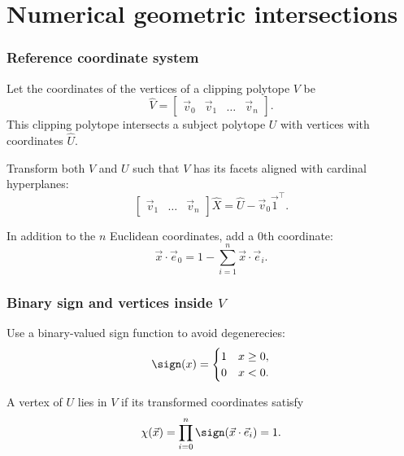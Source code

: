 \documentclass[10pt]{beamer}
\begin{document}
\section{Numerical geometric intersections}

\newcommand{\pcoord}[2]{#1 \cdot \vec{e}_{#2}}
\newcommand{\qcoord}[2]{\vec{q}_{#2}^{#1}}
\newcommand{\xcoord}[2]{\pcoord{\vec{x}_{#1}}{#2}}
\newcommand{\wcoord}[2]{\vec{w}_{#2}^{#1}}
\newcommand{\signx}[2]{\sign(\xcoord{#1}{#2})}
\newcommand{\signq}[3]{\sign(\pcoord{\qcoord{#1}{#2}}{#3})}

\begin{frame}
\frametitle{Reference coordinate system}

Let the coordinates of the vertices of a clipping polytope $V$ be
\begin{equation*}
	\hat{V} = \begin{bmatrix} \vec{v}_0 & \vec{v}_1 & \dots & \vec{v}_n \end{bmatrix}.
\end{equation*}
This clipping polytope intersects a subject polytope $U$ with vertices with coordinates $\hat{U}$.

Transform both $V$ and $U$ such that $V$ has its facets aligned with cardinal hyperplanes:
\begin{equation*}
	\begin{bmatrix} \vec{v}_1 & \dots & \vec{v}_n \end{bmatrix} \hat{X} = \hat{U} - \vec{v}_0 \vec{1}^\top.
\end{equation*}

In addition to the $n$ Euclidean coordinates, add a 0th coordinate:
\begin{equation*}
	\vec{x} \cdot \vec{e}_0 = 1 - \sum_{i=1}^n \vec{x} \cdot \vec{e}_i.
\end{equation*}

\end{frame}

\begin{frame}
\frametitle{Binary sign and vertices inside $V$}

Use a binary-valued sign function to avoid degenerecies:
\begin{equation*}
	\sign(x) = \begin{cases} 1 & x \geq 0, \\ 0 & x < 0. \end{cases}
\end{equation*}

A vertex of $U$ lies in $V$ if its transformed coordinates satisfy
\begin{equation*}
	\chi(\vec{x}) = \prod_{i=0}^n \sign(\vec{x} \cdot \vec{e}_i) = 1.
\end{equation*}

\end{frame}
\end{document}
